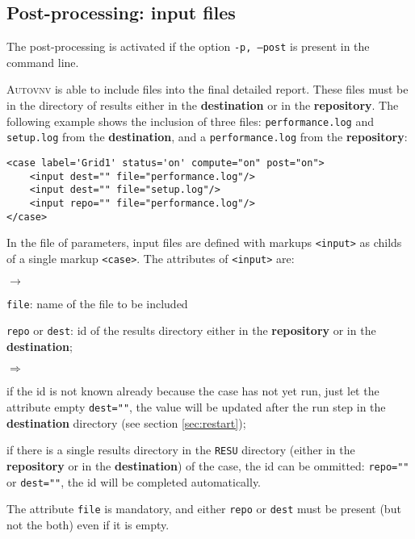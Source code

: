 \documentclass[a4paper,10pt,twoside]{csshortdoc}
\begin{document}
\subsection{Post-processing: input files}\label{sec:input}

The post-processing is activated if the option \texttt{-p, --post} is present
in the command line.

\textsc{Autovnv} is able to include files into the final detailed report. These
files must be in the directory of results either in the \textbf{destination} or
in the \textbf{repository}. The following example shows the inclusion of three
files: \texttt{performance.log} and \texttt{setup.log} from the
\textbf{destination}, and a \texttt{performance.log} from the \textbf{repository}:

\small
\begin{verbatim}
<case label='Grid1' status='on' compute="on" post="on">
    <input dest="" file="performance.log"/>
    <input dest="" file="setup.log"/>
    <input repo="" file="performance.log"/>
</case>
\end{verbatim}
\normalsize

In the file of parameters, input files are defined with markups \texttt{<input>}
as childs of a single markup \texttt{<case>}.
The attributes of \texttt{<input>} are:
\begin{list}{$\rightarrow$}{}
\item \texttt{file}: name of the file to be included
\item \texttt{repo} or \texttt{dest}: id of the results directory either in the
\textbf{repository} or in the \textbf{destination};
\begin{list}{$\Rightarrow$}{}
\item if the id is not known already because the case has not yet run, just let
the attribute empty \texttt{dest=""}, the value will be updated after the run
step in the \textbf{destination} directory (see section \ref{sec:restart});
\item if there is a single results directory in the \texttt{RESU} directory
(either in the \textbf{repository} or in the \textbf{destination}) of the case,
the id can be ommitted: \texttt{repo=""} or \texttt{dest=""}, the id will be
completed automatically.
\end{list}
\end{list}
The attribute \texttt{file} is mandatory, and either \texttt{repo} or
\texttt{dest} must be present (but not the both) even if it is empty.
\end{document}
